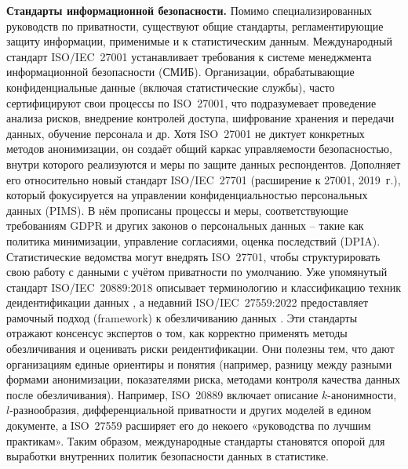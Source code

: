 \textbf{Стандарты информационной безопасности.} Помимо специализированных руководств по приватности, существуют общие
стандарты, регламентирующие защиту информации, применимые и к статистическим данным. Международный стандарт
ISO/IEC 27001 устанавливает требования к системе менеджмента информационной безопасности (СМИБ). Организации,
обрабатывающие конфиденциальные данные (включая статистические службы), часто сертифицируют свои процессы по ISO 27001,
что подразумевает проведение анализа рисков, внедрение контролей доступа, шифрование хранения и передачи данных,
обучение персонала и др. Хотя ISO 27001 не диктует конкретных методов анонимизации, он создаёт общий каркас
управляемости безопасностью, внутри которого реализуются и меры по защите данных респондентов. Дополняет его
относительно новый стандарт ISO/IEC 27701 (расширение к 27001, 2019 г.), который фокусируется на управлении
конфиденциальностью персональных данных (PIMS). В нём прописаны процессы и меры, соответствующие требованиям GDPR и
других законов о персональных данных – такие как политика минимизации, управление согласиями, оценка последствий (DPIA).
Статистические ведомства могут внедрять ISO 27701, чтобы структурировать свою работу с данными с учётом приватности по
умолчанию. Уже упомянутый стандарт ISO/IEC 20889:2018 описывает терминологию и классификацию техник деидентификации
данных \autocite{ISO-IEC-20889-2018}, а недавний ISO/IEC 27559:2022 предоставляет рамочный подход (framework) к
обезличиванию данных \autocite{ISO-IEC-27559-2022}. Эти стандарты отражают консенсус экспертов о том, как корректно
применять методы обезличивания и оценивать риски реидентификации. Они полезны тем, что дают организациям единые
ориентиры и понятия (например, разницу между разными формами анонимизации, показателями риска, методами контроля
качества данных после обезличивания). Например, ISO 20889 включает описание $k$-анонимности, $l$-разнообразия,
дифференциальной приватности и других моделей в едином документе, а ISO 27559 расширяет его до некоего «руководства по
лучшим практикам». Таким образом, международные стандарты становятся опорой для выработки внутренних политик
безопасности данных в статистике.

